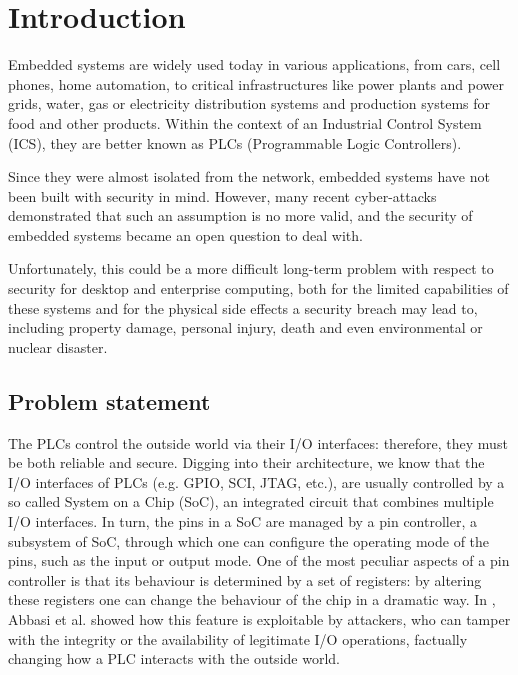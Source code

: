 \chapter{Introduction}
\label{chap:intro}

Embedded systems are widely used today in various applications, from cars, cell phones, home automation, to critical infrastructures
like power plants and power grids, water, gas or electricity distribution systems and production systems for food and other products.
Within the context of an Industrial Control System (ICS), they are better known as PLCs (Programmable Logic Controllers).

Since they were almost isolated from the network, embedded systems have not been built with security in mind.
However, many recent cyber-attacks demonstrated that such an assumption is no more valid, and the security of embedded systems became an open question to deal with.

Unfortunately, this could be a more difficult long-term problem with respect to security for desktop and enterprise computing,
both for the limited capabilities of these systems and for the physical side effects a security breach may lead to, including property damage, personal injury, death and
even environmental or nuclear disaster.


\section{Problem statement}

The PLCs control the outside world via their I/O interfaces: therefore, they must be both reliable and secure.
Digging into their architecture, we know that the I/O interfaces of PLCs (e.g. GPIO, SCI, JTAG, etc.),
are usually controlled by a so called System on a Chip (SoC), an integrated circuit that combines multiple I/O interfaces.
In turn, the pins in a SoC are managed by a pin controller, a subsystem of SoC, through which one can configure the operating mode of the pins, such as the input or output mode.
One of the most peculiar aspects of a pin controller is that its behaviour is determined by a set of registers: by altering these registers one can change the behaviour
of the chip in a dramatic way. In \cite{ghostplc}, Abbasi et al. showed how this feature is exploitable by attackers, who can tamper with
the integrity or the availability of legitimate I/O operations, factually changing how a PLC interacts with the outside world.

